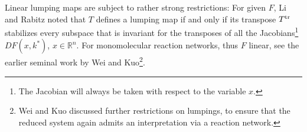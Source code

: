 \documentclass{article}
\begin{document}
Linear lumping maps are subject to rather strong restrictions: For given $F$, Li and Rabitz \cite{LR1989} noted that $T$ defines a lumping map if and only if its transpose $T^{\rm tr}$ stabilizes every subspace that is invariant for the transposes of all the Jacobians\footnote{The Jacobian will always be taken with respect to the variable $x$.} $DF(x, k^*)$, $x\in\mathbb R^n$. 
For monomolecular reaction networks, thus $F$ linear, see the earlier seminal work \cite{WK1969a} by Wei and Kuo\footnote{Wei and Kuo discussed further restrictions on lumpings, to ensure that the reduced system again admits an interpretation via a reaction network.}.
\end{document}

